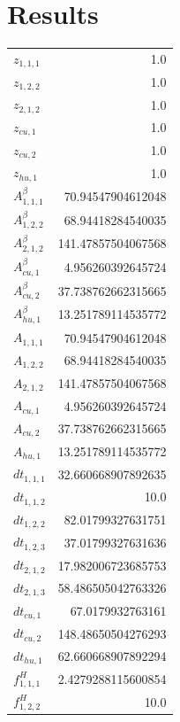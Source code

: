 \documentclass{article}%
\makeatletter
\let\mcnewpage=\newpage%
\newcommand{\TrickSupertabularIntoMulticols}{%
\renewcommand\newpage{%
\if@firstcolumn%
\hrule width\linewidth height0pt%
\columnbreak%
\else%
\mcnewpage%
\fi%
}%
}%
\makeatother
\begin{document}
\section{Results}%
\thispagestyle{plain}%
\begin{multicols*}{3}%
\TrickSupertabularIntoMulticols%
%
\begin{supertabular}{lr}%
	$z_{1,1,1}$ & 1.0 \\%
	$z_{1,2,2}$ & 1.0 \\%
	$z_{2,1,2}$ & 1.0 \\%
	$z_{cu,1}$ & 1.0 \\%
	$z_{cu,2}$ & 1.0 \\%
	$z_{hu,1}$ & 1.0 \\%
	$A_{1,1,1}^{\beta}$ & 70.94547904612048 \\%
	$A_{1,2,2}^{\beta}$ & 68.94418284540035 \\%
	$A_{2,1,2}^{\beta}$ & 141.47857504067568 \\%
	$A_{cu,1}^{\beta}$ & 4.956260392645724 \\%
	$A_{cu,2}^{\beta}$ & 37.738762662315665 \\%
	$A_{hu,1}^{\beta}$ & 13.251789114535772 \\%
	$A_{1,1,1}$ & 70.94547904612048 \\%
	$A_{1,2,2}$ & 68.94418284540035 \\%
	$A_{2,1,2}$ & 141.47857504067568 \\%
	$A_{cu,1}$ & 4.956260392645724 \\%
	$A_{cu,2}$ & 37.738762662315665 \\%
	$A_{hu,1}$ & 13.251789114535772 \\%
	$dt_{1,1,1}$ & 32.660668907892635 \\%
	$dt_{1,1,2}$ & 10.0 \\%
	$dt_{1,2,2}$ & 82.01799327631751 \\%
	$dt_{1,2,3}$ & 37.01799327631636 \\%
	$dt_{2,1,2}$ & 17.982006723685753 \\%
	$dt_{2,1,3}$ & 58.486505042763326 \\%
	$dt_{cu,1}$ & 67.0179932763161 \\%
	$dt_{cu,2}$ & 148.48650504276293 \\%
	$dt_{hu,1}$ & 62.660668907892294 \\%
	$f_{1,1,1}^{H}$ & 2.4279288115600854 \\%
	$f_{1,2,2}^{H}$ & 10.0 \\%

\end{supertabular}
\end{multicols*}
\end{document}
